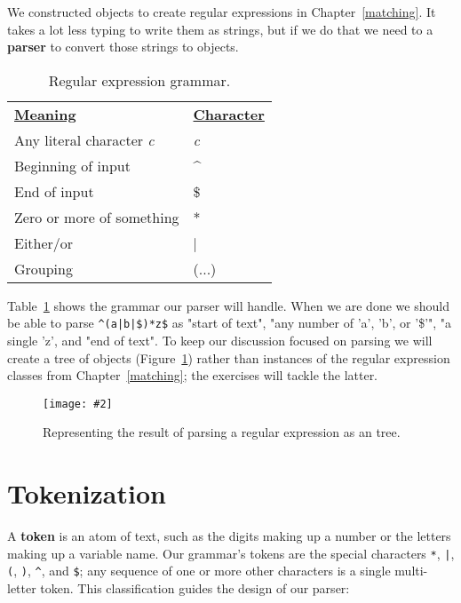 \documentclass{scrbook}
\newcommand{\chapref}[1]{Chapter~\ref{#1}}
\newcommand{\figref}[1]{Figure~\ref{#1}}
\newcommand{\tblref}[1]{Table~\ref{#1}}
\newcommand{\figpdf}[4]{\begin{figure}%
\centering%
\texttt{[image: \#2]}%
\caption{#3}%
\label{#1}%
\end{figure}}
\newcommand{\glossref}[1]{\textbf{#1}}
\begin{document}
We constructed objects to create regular expressions in \chapref{matching}.
It takes a lot less typing to write them as strings,
but if we do that we need to a \glossref{parser}
to convert those strings to objects.

\begin{table}
\begin{tabular}{ll}
\textbf{\underline{Meaning}} & \textbf{\underline{Character}} \\
Any literal character \emph{c} & \emph{c} \\
Beginning of input & {\textasciicircum} \\
End of input & \$ \\
Zero or more of something & * \\
Either/or & | \\
Grouping & (...) \\
\end{tabular}
\caption{Regular expression grammar.}
\label{parser-grammar}
\end{table}



\tblref{parser-grammar} shows the grammar our parser will handle.
When we are done
we should be able to parse \texttt{{\textasciicircum}(a|b|\$)*z\$} as
"start of text",
"any number of 'a', 'b', or '\$'",
"a single 'z',
and "end of text".
To keep our discussion focused on parsing
we will create a tree of objects (\figref{parser-parse-tree})
rather than instances of the regular expression classes from \chapref{matching};
the exercises will tackle the latter.

\figpdf{parser-parse-tree}{./parser/expression_tree.pdf}{Representing the result of parsing a regular expression as an tree.}{0.6}


\section{Tokenization}\label{parser-tokenize}


A \glossref{token} is an atom of text,
such as the digits making up a number or the letters making up a variable name.
Our grammar's tokens are the special characters \texttt{*}, \texttt{|}, \texttt{(}, \texttt{)}, \texttt{{\textasciicircum}}, and \texttt{\$};
any sequence of one or more other characters is a single multi-letter token.
This classification guides the design of our parser:
\end{document}
